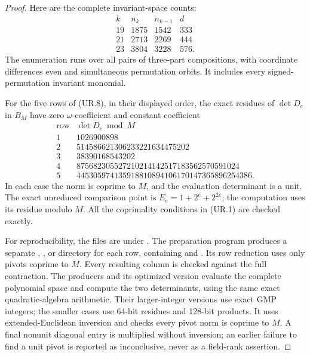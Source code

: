 \documentclass[11pt,a4paper]{article}
\theoremstyle{definition}
\begin{document}
\begin{proof}
Here are the complete invariant-space counts:
\[
 \begin{array}{c|r|r|r}
 k&n_k&n_{k-1}&d\\ \hline
 19&1875&1542&333\\
 21&2713&2269&444\\
 23&3804&3228&576.
 \end{array}
 \tag{UR.9}
\]
The enumeration runs over all pairs of three-part
compositions, with coordinate differences even and simultaneous
permutation orbits. It includes every signed-permutation
invariant monomial.

For the five rows of (UR.8), in their displayed order, the exact
residues of $\det D_e$ in $B_M$ have zero $\omega$-coefficient
and constant coefficient
\[
 \begin{array}{c|r}
 \text{row}&\det D_e\bmod M\\ \hline
 1&1026900898\\
 2&514586621306233221634475202\\
 3&38390168543202\\
 4&875682305527210214142517183562570591024\\
 5&445305974135918810894106170147365896254386.
 \end{array}
 \tag{UR.10}
\]
In each case the norm is coprime to $M$, and the evaluation
determinant is a unit. The exact unreduced comparison point is
$E_e=1+2^e+2^{2e}$; the computation uses its residue modulo $M$.
All the coprimality conditions in (UR.1) are checked exactly.

For reproducibility, the files are under
. The preparation program
 produces a separate
, , or  directory for each row,
containing  and . Its row
reduction uses only pivots coprime to $M$. Every resulting
column is checked against the full contraction. The producers
 and its optimized version
 evaluate the complete polynomial
space and compute the two determinants, using the same exact
quadratic-algebra arithmetic. Their larger-integer
versions use exact GMP integers; the smaller cases use
64-bit residues and 128-bit products. It uses extended-Euclidean
inversion and checks every pivot norm is coprime to $M$.
A final nonunit diagonal entry is multiplied without inversion;
an earlier failure to find a unit pivot is reported as
inconclusive, never as a field-rank assertion.


\end{proof}
\end{document}
